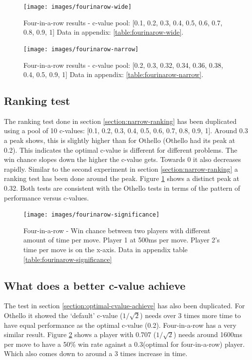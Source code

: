 \documentclass[
11pt, %
english, %
singlespacing, %
headsepline, %
]{MastersDoctoralThesis} %
\begin{document}
\begin{figure}
	\captionsetup{width=.45\textwidth}
	\begin{minipage}[t]{0.49\textwidth}
		\centering
		\texttt{[image: images/fourinarow-wide]}
		\caption{Four-in-a-row results - c-value pool: [0.1, 0.2, 0.3, 0.4, 0.5, 0.6, 0.7, 0.8, 0.9, 1] Data in appendix: \ref{table:fourinarow-wide}.}
		\label{fig:fourinarow-wide}
	\end{minipage}
	\begin{minipage}[t]{0.49\textwidth}
		\centering
		\texttt{[image: images/fourinarow-narrow]}
		\caption{Four-in-a-row results - c-value pool: [0.2, 0.3, 0.32, 0.34, 0.36, 0.38, 0.4, 0.5, 0.9, 1] Data in appendix: \ref{table:fourinarow-narrow}.}
		\label{fig:fourinarow-narrow}
	\end{minipage}
\end{figure}
\subsection{Ranking test}
The ranking test done in section \ref{section:narrow-ranking} has been duplicated using a pool of 10 c-values: [0.1, 0.2, 0.3, 0.4, 0.5, 0.6, 0.7, 0.8, 0.9, 1]. Around 0.3 a peak shows, this is slightly higher than for Othello (Othello had its peak at 0.2). This indicates the optimal c-value is different for different problems. The win chance slopes down the higher the c-value gets. Towards 0 it also decreases rapidly. Similar to the second experiment in section \ref{section:narrow-ranking} a ranking test has been done around the peak. Figure \ref{fig:fourinarow-narrow} shows a distinct peak at 0.32. Both tests are consistent with the Othello tests in terms of the pattern of performance versus c-values.

\begin{figure}
	\centering
	\texttt{[image: images/fourinarow-significance]}
	\caption{Four-in-a-row - Win chance between two players with different amount of time per move. Player 1 at 500ms per move. Player 2's time per move is on the x-axis. Data in appendix table \ref{table:fourinarow-significance}}
	\label{fig:fourinarow-significance}
\end{figure}
\subsection{What does a better c-value achieve}
The test in section \ref{section:optimal-cvalue-achieve} has also been duplicated. For Othello it showed the `default' c-value ($1/\sqrt{2}$) needs over 3 times more time to have equal performance as the optimal c-value (0.2). Four-in-a-row has a very similar result. Figure \ref{fig:fourinarow-significance} shows a player with 0.707 ($1/\sqrt{2}$) needs around 1600ms per move to have a 50\% win rate against a 0.3(optimal for four-in-a-row) player. Which also comes down to around a 3 times increase in time.
\end{document}
